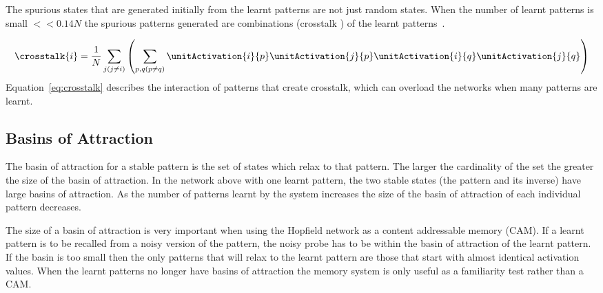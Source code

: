 The spurious states that are generated initially from the learnt patterns are not just random states.  When the number of learnt patterns is small $<<0.14N$ the spurious patterns generated are combinations (crosstalk ) of the learnt patterns~\citep{Amit1987}.

\begin{equation}
	\label{eq:crosstalk}
	\displaystyle \crosstalk{i} = \frac{1}{N}\sum_{{j \\ (j \ne i)}}\left( \sum_{p,q (p\ne q)} 		\unitActivation{i}{p}\unitActivation{j}{p}\unitActivation{i}{q}\unitActivation{j}{q}\right)
\end{equation}
Equation~\eqref{eq:crosstalk} describes the interaction of patterns that create crosstalk, which can overload the networks when many patterns are learnt.

\subsection{Basins of Attraction}
\label{sec:Stable}

The basin of attraction for a stable pattern is the set of states which relax to that pattern.  The larger the cardinality of the set the greater the size of the basin of attraction.  In the  network above with one learnt pattern, the two stable states (the pattern and its inverse) have large basins of attraction.  As the number of patterns learnt by the system increases the size of the basin of attraction of each individual pattern decreases.

The size of a basin of attraction is very important when using the Hopfield network as a content addressable memory (CAM).  If a learnt pattern is to be recalled from a noisy version of the pattern, the noisy probe has to be within the basin of attraction of the learnt pattern.  If the basin is too small then the only patterns that will relax to the learnt pattern are those that start with almost identical activation values.  When the learnt patterns no longer have basins of attraction the memory system is only useful as a familiarity test rather than a CAM.

